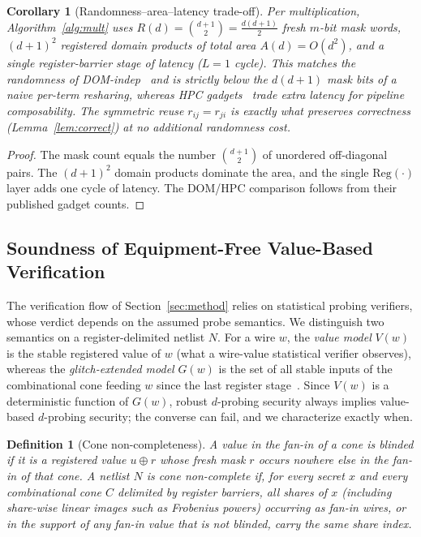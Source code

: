 \documentclass[lettersize,journal]{IEEEtran}
\newtheorem{definition}{Definition}
\newtheorem{corollary}{Corollary}
\begin{document}
\begin{corollary}[Randomness--area--latency trade-off]
\label{cor:cost}
Per multiplication, Algorithm~\ref{alg:mult} uses
$R(d)=\binom{d+1}{2}=\tfrac{d(d+1)}{2}$ fresh $m$-bit mask words, $(d{+}1)^2$ registered
domain products of total area $A(d)=O(d^2)$, and a single register-barrier stage
of latency ($L=1$ cycle). This matches the randomness of
DOM-\emph{indep}~\cite{gross2016dom} and is strictly below the $d(d{+}1)$ mask
bits of a naive per-term resharing, whereas HPC gadgets~\cite{cassiers2020hpc}
trade extra latency for pipeline composability. The symmetric reuse
$r_{ij}=r_{ji}$ is exactly what preserves correctness (Lemma~\ref{lem:correct})
at no additional randomness cost.
\end{corollary}
\begin{proof}
The mask count equals the number $\binom{d+1}{2}$ of unordered off-diagonal
pairs. The $(d{+}1)^2$ domain products dominate the area, and the single
$\mathrm{Reg}(\cdot)$ layer adds one cycle of latency. The DOM/HPC comparison
follows from their published gadget counts.
\end{proof}

\subsection{Soundness of Equipment-Free Value-Based Verification}
\label{sec:soundness}
The verification flow of Section~\ref{sec:method} relies on statistical
probing verifiers, whose verdict depends on the assumed probe semantics.
We distinguish two semantics on a register-delimited netlist $N$. For a
wire $w$, the \emph{value model} $V(w)$ is the stable registered value of
$w$ (what a wire-value statistical verifier observes), whereas the
\emph{glitch-extended model} $G(w)$ is the set of all stable inputs of the
combinational cone feeding $w$ since the last register
stage~\cite{faust2018composable}. Since $V(w)$ is a deterministic function
of $G(w)$, robust $d$-probing security always implies value-based
$d$-probing security; the converse can fail, and we characterize exactly
when.

\begin{definition}[Cone non-completeness]
\label{def:cone-nc}
A value in the fan-in of a cone is \emph{blinded} if it is a registered value
$u\oplus r$ whose fresh mask $r$ occurs nowhere else in the fan-in of that
cone. A netlist $N$ is \emph{cone non-complete} if, for every secret $x$ and
every combinational cone $C$ delimited by register barriers, all shares of
$x$ (including share-wise linear images such as Frobenius powers) occurring
as fan-in wires, or in the support of any fan-in value that is not blinded,
carry the same share index.
\end{definition}
\end{document}
